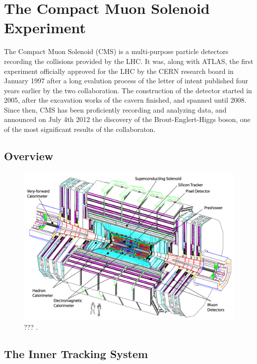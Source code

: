 \chapter{The Compact Muon Solenoid Experiment}
\label{chap:I-3-cms}

	The Compact Muon Solenoid (CMS) \cite{1748-0221-3-08-S08004} is a multi-purpose particle detectors recording the collisions provided by the LHC. It was, along with ATLAS, the first experiment officially approved for the LHC by the CERN research board in January 1997 after a long evalution process of the letter of intent published four years earlier by the two collaboration. The construction of the detector started in 2005, after the excavation works of the cavern finished, and spanned until 2008. Since then, CMS has been proficiently recording and analyzing data, and announced on July 4th 2012 the discovery of the Brout-Englert-Higgs boson, one of the most significant results of the collaboraton.

  \section{Overview}

    \begin{figure}[h!]
      \centering
      \includegraphics[width=\textwidth]{img/I-3-cms/cms.png}
      \caption{??? \cite{1748-0221-3-08-S08004}.}
      \label{fig:I-3-cms-global-view}
    \end{figure}

  \section{The Inner Tracking System}


